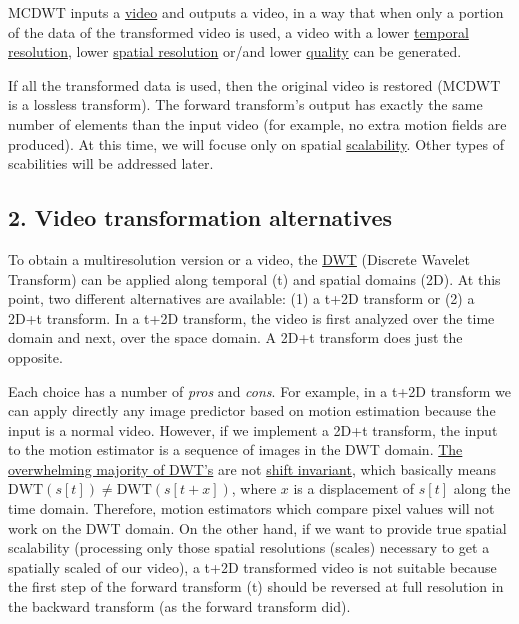 MCDWT inputs a \href{https://en.wikipedia.org/wiki/Video}{video} and
outputs a video, in a way that when only a portion of the data of the
transformed video is used, a video with a lower
\href{https://en.wikipedia.org/wiki/Temporal_resolution}{temporal
resolution}, lower
\href{https://en.wikipedia.org/wiki/Image_resolution\#Spatial_resolution}{spatial
resolution} or/and lower
\href{https://en.wikipedia.org/wiki/Compression_artifact}{quality} can
be generated.

If all the transformed data is used, then the original video is restored
(MCDWT is a lossless transform). The forward transform's output has
exactly the same number of elements than the input video (for example,
no extra motion fields are produced). At this time, we will focuse only
on spatial
\href{http://inst.eecs.berkeley.edu/~ee290t/sp04/lectures/videowavelet_UCB1-3.pdf}{scalability}.
Other types of scabilities will be addressed later.

    \hypertarget{video-transformation-alternatives}{%
\subsection{2. Video transformation
alternatives}\label{video-transformation-alternatives}}

To obtain a multiresolution version or a video, the
\href{https://en.wikipedia.org/wiki/Discrete_wavelet_transform}{DWT}
(Discrete Wavelet Transform) can be applied along temporal (t) and
spatial domains (2D). At this point, two different alternatives are
available: (1) a t+2D transform or (2) a 2D+t transform. In a t+2D
transform, the video is first analyzed over the time domain and next,
over the space domain. A 2D+t transform does just the opposite.

Each choice has a number of \emph{pros} and \emph{cons}. For example, in
a t+2D transform we can apply directly any image predictor based on
motion estimation because the input is a normal video. However, if we
implement a 2D+t transform, the input to the motion estimator is a
sequence of images in the DWT domain.
\href{http://www.polyvalens.com/blog/wavelets/theory}{The overwhelming
majority of DWT's} are not
\href{http://www.polyvalens.com/blog/wavelets/theory}{shift invariant},
which basically means \(\text{DWT}(s[t]) \neq \text{DWT}(s[t+x])\),
where \(x\) is a displacement of \(s[t]\) along the time domain.
Therefore, motion estimators which compare pixel values will not work on
the DWT domain. On the other hand, if we want to provide true spatial
scalability (processing only those spatial resolutions (scales)
necessary to get a spatially scaled of our video), a t+2D transformed
video is not suitable because the first step of the forward transform
(t) should be reversed at full resolution in the backward transform (as
the forward transform did).

